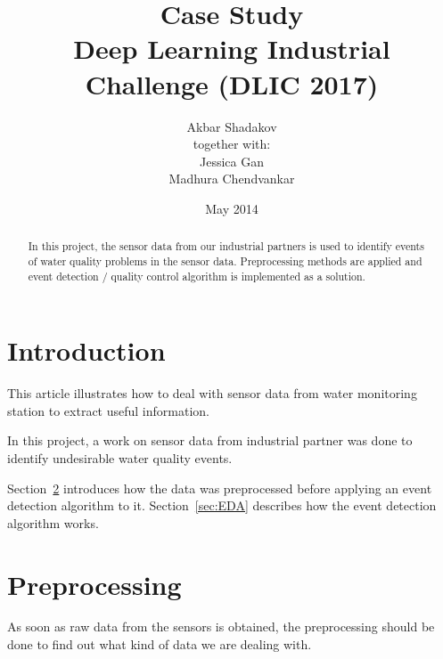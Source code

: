 \documentclass[runningheads]{llncs}
\begin{document}
\mainmatter
\title{Case Study\\Deep Learning Industrial Challenge (DLIC 2017) 
}
\author{Akbar Shadakov\\together with:\\Jessica Gan\\Madhura Chendvankar}
\date{May 2014}
\maketitle

\begin{abstract} In this project, the sensor data from our industrial 
partners is used to identify events of water quality problems in the sensor data. 
Preprocessing methods are applied and event detection / quality control algorithm is implemented as a solution. 
\end{abstract}

\section{Introduction}
This article illustrates how to deal with sensor data from water monitoring station to extract useful information. 

In this project, a work on sensor data from industrial partner was done to identify undesirable water quality events.

Section~\ref{sec:Preprocessing} introduces how the data was preprocessed before applying an event detection algorithm to it.
Section~\ref{sec:EDA} describes how the event detection algorithm works.

\section{Preprocessing}\label{sec:Preprocessing}
As soon as raw data from the sensors is obtained, the preprocessing should be done to find out what kind of data we are dealing with. 
\end{document}
